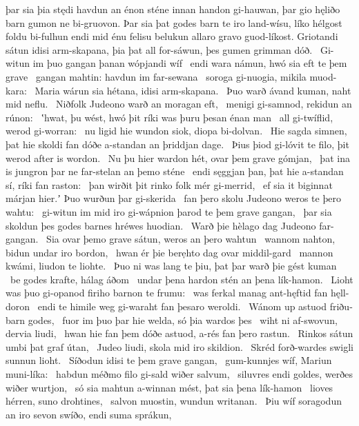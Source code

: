 þar sia þia stędi havdun an énon sténe innan
handon gi-hauwan, þar gio hęliðo barn
gumon ne bi-gruovon. Þar sia þat godes barn
te iro land-wísu, líko hélgost
foldu bi-fulhun endi mid énu felisu belukun
allaro gravo guod-líkost. Griotandi sátun
idisi arm-skapana, þia þat all for-sáwun,
þes gumen grimman dóð. \hld\ Gi-witun im þuo gangan þanan
wópjandi wíf \hld\ endi wara námun,
hwó sia eft te þem grave \hld\ gangan mahtin:
havdun im far-sewana \hld\ soroga gi-nuogia,
mikila muod-kara: \hld\ Maria wárun sia hétana,
idisi arm-skapana. \hld\ Þuo warð ávand kuman,
naht mid neflu. \hld\ Niðfolk Judeono
warð an moragan eft, \hld\ menigi gi-samnod,
rekidun an rúnon: \hld\ ʽhwat, þu wést, hwó þit ríki was
þuru þesan énan man \hld\ all gi-twíflid,
werod gi-worran: \hld\ nu ligid hie wundon siok,
diopa bi-dolvan. \hld\ Hie sagda simnen, þat hie skoldi fan dóðe a-standan
an þriddjan dage. \hld\ Þius þiod gi-lóvit te filo,
þit werod after is wordon. \hld\ Nu þu hier wardon hét,
ovar þem grave gómjan, \hld\ þat ina is jungron þar
ne far-stelan an þemo sténe \hld\ endi sęggjan þan, þat hie a-standan sí,
ríki fan raston: \hld\ þan wirðit þit rinko folk
mér gi-merrid, \hld\ ef sia it biginnat márjan hier.ʼ
Þuo wurðun þar gi-skerida \hld\ fan þero skolu Judeono
weros te þero wahtu: \hld\ gi-witun im mid iro gi-wápnion þarod
te þem grave gangan, \hld\ þar sia skoldun þes godes barnes
hréwes huodian. \hld\ Warð þie hèlago dag
Judeono far-gangan. \hld\ Sia ovar þemo grave sátun,
weros an þero wahtun \hld\ wannom nahton,
bidun undar iro bordon, \hld\ hwan ér þie berẹhto dag
ovar middil-gard \hld\ mannon kwámi,
liudon te liohte. \hld\ Þuo ni was lang te þiu,
þat þar warð þie gést kuman \hld\ be godes krafte,
hálag áðom \hld\ undar þena hardon stén
an þena lík-hamon. \hld\ Lioht was þuo gi-opanod
firiho barnon te frumu: \hld\ was ferkal manag
ant-hęftid fan hęll-doron \hld\ endi te himile weg
gi-waraht fan þesaro weroldi. \hld\ Wánom up astuod
friðu-barn godes, \hld\ fuor im þuo þar hie welda,
só þia wardos þes \hld\ wiht ni af-swovun,
dervia liudi, \hld\ hwan hie fan þem dóðe astuod,
a-rés fan þero rastun. \hld\ Rinkos sátun
umbi þat graf útan, \hld\ Judeo liudi,
skola mid iro skildion. \hld\ Skréd forð-wardes
swigli sunnun lioht. \hld\ Síðodun idisi
te þem grave gangan, \hld\ gum-kunnjes wíf,
Mariun muni-líka: \hld\ habdun méðmo filo
gi-sald wiðer salvum, \hld\ siluvres endi goldes,
werðes wiðer wurtjon, \hld\ só sia mahtun a-winnan mést,
þat sia þena lík-hamon \hld\ lioves hérren,
suno drohtines, \hld\ salvon muostin,
wundun writanan. \hld\ Þiu wíf soragodun
an iro sevon swíðo, endi suma sprákun,

